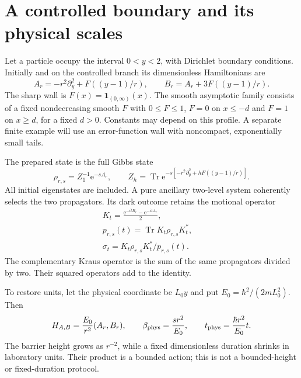 \documentclass[aps,pra,reprint,superscriptaddress,longbibliography]{revtex4-2}
\newcommand{\Tr}{\operatorname{Tr}}
\newcommand{\ee}{\mathrm e}
\newcommand{\one}{\mathbf 1}
\begin{document}
\section{A controlled boundary and its physical scales}
\label{sec:model}

Let a particle occupy the interval $0<y<2$, with Dirichlet boundary
conditions. Initially and on the controlled branch its dimensionless
Hamiltonians are
\begin{equation}
 A_r=-r^2\partial_y^2+F((y-1)/r),\qquad
 B_r=A_r+3F((y-1)/r).                         \label{eq:ham}
\end{equation}
The sharp wall is $F(x)=\one_{(0,\infty)}(x)$. The smooth asymptotic
family consists of a fixed nondecreasing smooth $F$ with $0\le F\le1$,
$F=0$ on $x\le-d$ and $F=1$ on $x\ge d$, for a fixed $d>0$.
Constants may depend on this profile. A separate finite example will
use an error-function wall with noncompact, exponentially small tails.

The prepared state is the full Gibbs state
\begin{equation}
 \rho_{r,s}=Z_1^{-1}\ee^{-sA_r},\qquad
 Z_h=\Tr\ee^{-s[-r^2\partial_y^2+hF((y-1)/r)]}.
                                                               \label{eq:gibbs}
\end{equation}
All initial eigenstates are included. A pure ancillary two-level
system coherently selects the two propagators. Its dark outcome
retains the motional operator
\begin{equation}
 \begin{gathered}
 K_t=\frac{\ee^{-itB_r}-\ee^{-itA_r}}2,\quad\\
 p_{r,s}(t)=\Tr K_t\rho_{r,s}K_t^*,\quad\\
 \sigma_t=K_t\rho_{r,s}K_t^*/p_{r,s}(t).          \label{eq:kraus}
 \end{gathered}
\end{equation}
The complementary Kraus operator is the sum of the same propagators
divided by two. Their squared operators add to the identity.

To restore units, let the physical coordinate be $L_0y$ and put
$E_0=\hbar^2/(2mL_0^2)$. Then
\begin{equation}
 H_{A,B}=\frac{E_0}{r^2}(A_r,B_r),\qquad
 \beta_{\rm phys}=\frac{s r^2}{E_0},\qquad
 t_{\rm phys}=\frac{\hbar r^2}{E_0}t.             \label{eq:units}
\end{equation}
The barrier height grows as $r^{-2}$, while a fixed dimensionless
duration shrinks in laboratory units. Their product is a bounded
action; this is not a bounded-height or fixed-duration protocol.
\end{document}
